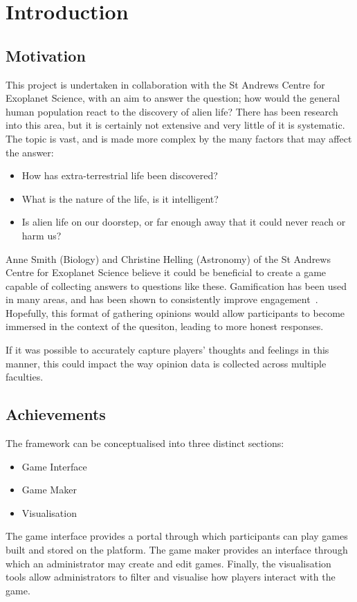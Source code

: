 \chapter{Introduction}

\section{Motivation}
This project is undertaken in collaboration with the St Andrews Centre for Exoplanet Science, with an aim to answer the question; how would the general human population react to the discovery of alien life?
There has been research~\cite{ReactionsToMessage, HowReactDiscovery, Fear} into this area, but it is certainly not extensive and very little of it is systematic. The topic is vast, and is made more complex by the many factors that may affect the answer:
\begin{itemize}
    \item How has extra-terrestrial life been discovered?
    \item What is the nature of the life, is it intelligent?
    \item Is alien life on our doorstep, or far enough away that it could never reach or harm us?
\end{itemize}
Anne Smith (Biology) and Christine Helling (Astronomy) of the St Andrews Centre for Exoplanet Science believe it could be beneficial to create a game capable of collecting answers to questions like these. Gamification has been used in many areas, and has been shown to consistently improve engagement~\cite{engage}. Hopefully, this format of gathering opinions would allow participants to become immersed in the context of the quesiton, leading to more honest responses. 

If it was possible to accurately capture players' thoughts and feelings in this manner, this could impact the way opinion data is collected across multiple faculties.

\section{Achievements}
The \od{} framework can be conceptualised into three distinct sections:
\begin{itemize}
    \item Game Interface
    \item Game Maker
    \item Visualisation
\end{itemize}
The game interface provides a portal through which participants can play games built and stored on the platform. The game maker provides an interface through which an administrator may create and edit games. Finally, the visualisation tools allow administrators to filter and visualise how players interact with the game.

